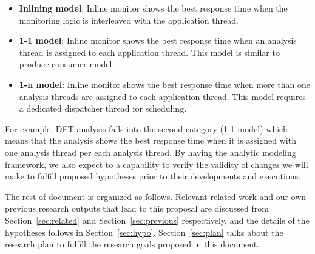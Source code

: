 \begin{itemize}

    \item {\bf Inlining model}: Inline monitor shows the best response time
            when the monitoring logic is interleaved with the application
            thread.

    \item {\bf 1-1 model}: Inline monitor shows the best response time when an
            analysis thread is assigned to each application thread. This model
            is similar to produce consumer model.

    \item {\bf 1-n model}: Inline monitor shows the best response time when
            more than one analysis threads are assigned to each application
            thread.  This model requires a dedicated dispatcher thread for
            scheduling.
    \end{itemize}

For example, DFT analysis falls into the second category (1-1 model) which
means that the analysis shows the best response time when it is assigned with
one analysis thread per each analysis thread.  
%
By having the analytic modeling framework, we also expect to a capability to
verify the validity of changes we will make to fulfill proposed hypotheses
prior to their developments and executions. 

The rest of document is organized as follows. Relevant related work and our own
previous research outputs that lead to this proposal are discussed from
Section~\ref{sec:related} and Section~\ref{sec:previous} respectively, and the
details of the hypotheses follows in Section~\ref{sec:hypo}.
Section~\ref{sec:plan} talks about the research plan to fulfill the research
goals proposed in this document.

